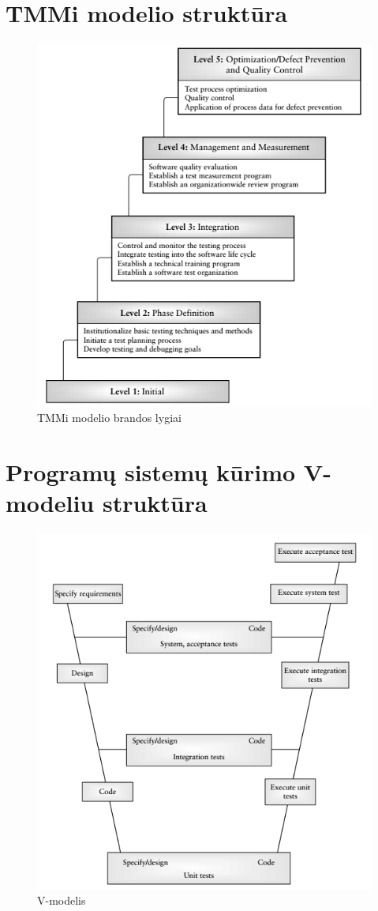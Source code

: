 \documentclass{VUMIFPSkursinis}
\begin{document}
\section{TMMi modelio struktūra}
\begin{figure}[H]
    \centering
    \includegraphics[scale=0.85]{img/TMMI}
    \caption{TMMi modelio brandos lygiai \cite{Burnstein:2010:PST:1965566}}
    \label{img:tmmi}
\end{figure}

\section{Programų sistemų kūrimo V-modeliu struktūra}
\begin{figure}[H]
    \centering
    \includegraphics[scale=1]{img/Vmodel}
    \caption{V-modelis \cite{Burnstein:2010:PST:1965566}}
    \label{img:vmodel}
\end{figure}
\end{document}

